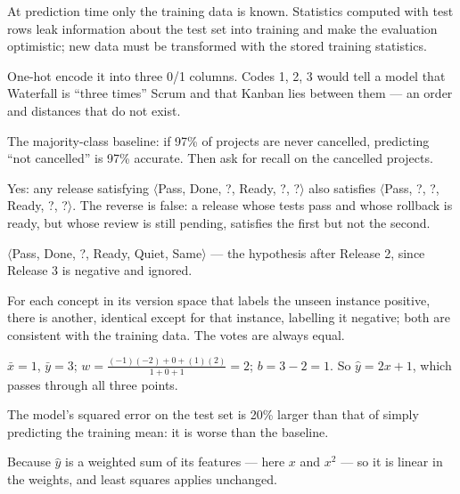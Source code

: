 \begin{ans}
  \item At prediction time only the training data is known. Statistics computed with
        test rows leak information about the test set into training and make the
        evaluation optimistic; new data must be transformed with the stored training
        statistics.
  \item One-hot encode it into three 0/1 columns. Codes 1, 2, 3 would tell a model that
        Waterfall is ``three times'' Scrum and that Kanban lies between them --- an
        order and distances that do not exist.
  \item The majority-class baseline: if 97\% of projects are never cancelled,
        predicting ``not cancelled'' is 97\% accurate. Then ask for recall on the
        cancelled projects.
\end{ans}

\begin{ans}
  \item Yes: any release satisfying $\langle$Pass, Done, ?, Ready, ?, ?$\rangle$ also
        satisfies $\langle$Pass, ?, ?, Ready, ?, ?$\rangle$. The reverse is false: a
        release whose tests pass and whose rollback is ready, but whose review is
        still pending, satisfies the first but not the second.
  \item $\langle$Pass, Done, ?, Ready, Quiet, Same$\rangle$ --- the hypothesis after
        Release 2, since Release 3 is negative and ignored.
  \item For each concept in its version space that labels the unseen instance positive,
        there is another, identical except for that instance, labelling it negative;
        both are consistent with the training data. The votes are always equal.
\end{ans}

\begin{ans}
  \item $\bar{x} = 1$, $\bar{y} = 3$; $w = \frac{(-1)(-2) + 0 + (1)(2)}{1 + 0 + 1} = 2$;
        $b = 3 - 2 = 1$. So $\hat{y} = 2x + 1$, which passes through all three points.
  \item The model's squared error on the test set is 20\% larger than that of simply
        predicting the training mean: it is worse than the baseline.
  \item Because $\hat{y}$ is a weighted sum of its features --- here $x$ and $x^2$ --- so
        it is linear in the weights, and least squares applies unchanged.
\end{ans}


